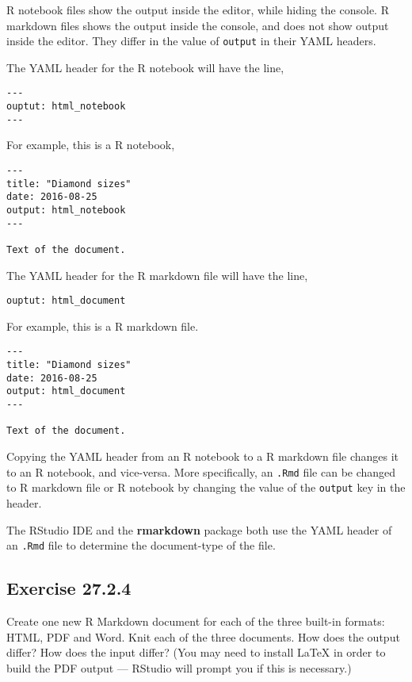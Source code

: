 \documentclass[]{book}
\theoremstyle{plain}
\theoremstyle{remark}
\begin{document}
R notebook files show the output inside the editor, while hiding the
console. R markdown files shows the output inside the console, and does
not show output inside the editor. They differ in the value of
\texttt{output} in their YAML headers.

The YAML header for the R notebook will have the line,

\begin{verbatim}
---
ouptut: html_notebook
---
\end{verbatim}

For example, this is a R notebook,

\begin{verbatim}
---
title: "Diamond sizes"
date: 2016-08-25
output: html_notebook
---

Text of the document.
\end{verbatim}

The YAML header for the R markdown file will have the line,

\begin{verbatim}
ouptut: html_document
\end{verbatim}

For example, this is a R markdown file.

\begin{verbatim}
---
title: "Diamond sizes"
date: 2016-08-25
output: html_document
---

Text of the document.
\end{verbatim}

Copying the YAML header from an R notebook to a R markdown file changes
it to an R notebook, and vice-versa. More specifically, an \texttt{.Rmd}
file can be changed to R markdown file or R notebook by changing the
value of the \texttt{output} key in the header.

The RStudio IDE and the \textbf{rmarkdown} package both use the YAML
header of an \texttt{.Rmd} file to determine the document-type of the
file.

\hypertarget{exercise-27.2.4}{%
\subsection*{\texorpdfstring{Exercise
{27.2.4}}{Exercise 27.2.4}}\label{exercise-27.2.4}}

Create one new R Markdown document for each of the three built-in
formats: HTML, PDF and Word. Knit each of the three documents. How does
the output differ? How does the input differ? (You may need to install
LaTeX in order to build the PDF output --- RStudio will prompt you if
this is necessary.)
\end{document}
